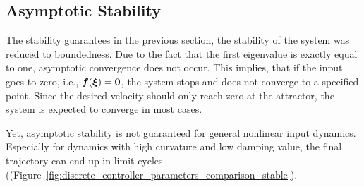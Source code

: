 \subsection{Asymptotic Stability}
The stability guarantees in the previous section, the stability of the system was reduced to boundedness. 
Due to the fact that the first eigenvalue is exactly equal to one, asymptotic convergence does not occur. 
This implies, that if the input goes to zero, i.e., $\boldsymbol{f}(\boldsymbol{\xi}) = \boldsymbol{0}$, the system stops and does not converge to a specified point. Since the desired velocity should only reach zero at the attractor, the system is expected to converge in most cases.

Yet, asymptotic stability is not guaranteed for general nonlinear input dynamics. Especially for dynamics with high curvature and low damping value, the final trajectory can end up in limit cycles ((Figure~\ref{fig:discrete_controller_parameters_comparison_stable}).

